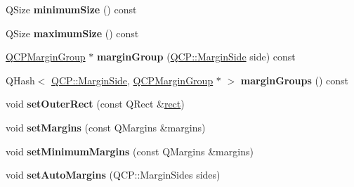 \begin{DoxyCompactItemize}
\item 
Q\+Size {\bfseries minimum\+Size} () const \hypertarget{class_q_c_p_layout_element_ae71f9230171d2d898e21dc461fc3df03}{}\label{class_q_c_p_layout_element_ae71f9230171d2d898e21dc461fc3df03}

\item 
Q\+Size {\bfseries maximum\+Size} () const \hypertarget{class_q_c_p_layout_element_a1fc85c79e15c2ab8051eccd455fccc4a}{}\label{class_q_c_p_layout_element_a1fc85c79e15c2ab8051eccd455fccc4a}

\item 
\hyperlink{class_q_c_p_margin_group}{Q\+C\+P\+Margin\+Group} $\ast$ {\bfseries margin\+Group} (\hyperlink{namespace_q_c_p_a7e487e3e2ccb62ab7771065bab7cae54}{Q\+C\+P\+::\+Margin\+Side} side) const \hypertarget{class_q_c_p_layout_element_a22cb1bb62c452fd802e43ca2524660db}{}\label{class_q_c_p_layout_element_a22cb1bb62c452fd802e43ca2524660db}

\item 
Q\+Hash$<$ \hyperlink{namespace_q_c_p_a7e487e3e2ccb62ab7771065bab7cae54}{Q\+C\+P\+::\+Margin\+Side}, \hyperlink{class_q_c_p_margin_group}{Q\+C\+P\+Margin\+Group} $\ast$ $>$ {\bfseries margin\+Groups} () const \hypertarget{class_q_c_p_layout_element_ac43921c997570389c14a1671bc3ea499}{}\label{class_q_c_p_layout_element_ac43921c997570389c14a1671bc3ea499}

\item 
void {\bfseries set\+Outer\+Rect} (const Q\+Rect \&\hyperlink{class_q_c_p_layout_element_affdfea003469aac3d0fac5f4e06171bc}{rect})\hypertarget{class_q_c_p_layout_element_a38975ea13e36de8e53391ce41d94bc0f}{}\label{class_q_c_p_layout_element_a38975ea13e36de8e53391ce41d94bc0f}

\item 
void {\bfseries set\+Margins} (const Q\+Margins \&margins)\hypertarget{class_q_c_p_layout_element_a8f450b1f3f992ad576fce2c63d8b79cf}{}\label{class_q_c_p_layout_element_a8f450b1f3f992ad576fce2c63d8b79cf}

\item 
void {\bfseries set\+Minimum\+Margins} (const Q\+Margins \&margins)\hypertarget{class_q_c_p_layout_element_a0a8a17abc16b7923159fcc7608f94673}{}\label{class_q_c_p_layout_element_a0a8a17abc16b7923159fcc7608f94673}

\item 
void {\bfseries set\+Auto\+Margins} (Q\+C\+P\+::\+Margin\+Sides sides)\hypertarget{class_q_c_p_layout_element_accfda49994e3e6d51ed14504abf9d27d}{}\label{class_q_c_p_layout_element_accfda49994e3e6d51ed14504abf9d27d}


\end{DoxyCompactItemize}
